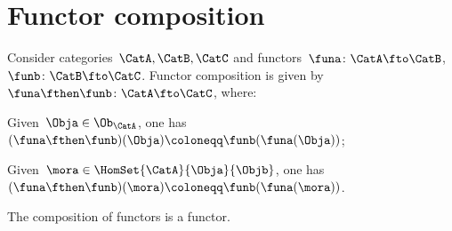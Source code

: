 

\section{Functor composition}

\begin{ctdefinition}
    \label{def:functor_composition}
    Consider categories~$\CatA,\CatB,\CatC$ and functors~$\funa\colon \CatA\fto \CatB$,~$\funb \colon \CatB\fto \CatC$.
    Functor composition is given by~$\funa\fthen \funb\colon \CatA \fto \CatC$, where:
    \begin{compactitem}
        \item Given~$\Obja\in \Ob_\CatA$, one has~$(\funa\fthen \funb)(\Obja)\coloneqq\funb(\funa(\Obja))$;
        \item Given~$\mora \in \HomSet{\CatA}{\Obja}{\Objb}$, one has~$(\funa\fthen \funb)(\mora)\coloneqq \funb(\funa(\mora))$.
    \end{compactitem}
\end{ctdefinition}

\begin{lemma}
    \label{lem:functors_compose}
    The composition of functors is a functor.
\end{lemma}

